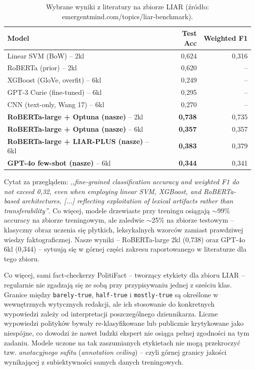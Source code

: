 \documentclass[11pt,a4paper]{article}
\begin{document}
\begin{table}[h]
\centering
\caption{Wybrane wyniki z literatury na zbiorze LIAR (źródło:
emergentmind.com/topics/liar-benchmark).}
\label{tab:liar_ceiling}
\begin{tabular}{lrr}
\toprule
Model & Test Acc & Weighted F1 \\
\midrule
Linear SVM (BoW) -- 2kl                  & 0{,}624 & 0{,}316 \\
RoBERTa (prior) -- 2kl                   & 0{,}620 & -- \\
XGBoost (GloVe, overfit) -- 6kl          & 0{,}249 & -- \\
GPT-3 Curie (fine-tuned) -- 6kl          & 0{,}295 & -- \\
CNN (text-only, Wang 17) -- 6kl          & 0{,}270 & -- \\
\midrule
\textbf{RoBERTa-large + Optuna (nasze)} -- 2kl & \textbf{0{,}738} & 0{,}735 \\
\textbf{RoBERTa-large + Optuna (nasze)} -- 6kl & \textbf{0{,}357} & 0{,}357 \\
\textbf{RoBERTa-large + LIAR-PLUS (nasze)} -- 6kl & \textbf{0{,}383} & 0{,}379 \\
\textbf{GPT-4o few-shot (nasze)} -- 6kl  & \textbf{0{,}344} & 0{,}341 \\
\bottomrule
\end{tabular}
\end{table}

Cytat za przeglądem: \emph{,,fine-grained classification accuracy and
weighted F1 do not exceed 0{,}32, even when employing linear SVM, XGBoost,
and RoBERTa-based architectures, [...] reflecting exploitation of lexical
artifacts rather than transferability''}. Co więcej, modele drzewiaste
przy treningu osiągają $\sim$99\% accuracy na zbiorze treningowym, ale
zaledwie $\sim$25\% na zbiorze testowym -- klasyczny obraz uczenia się
płytkich, leksykalnych wzorców zamiast prawdziwej wiedzy faktograficznej.
Nasze wyniki -- RoBERTa-large 2kl (0{,}738) oraz GPT-4o 6kl (0{,}344) --
sytuują się w górnej części zakresu raportowanego w literaturze dla tego
zbioru.

Co więcej, sami fact-checkerzy PolitiFact -- tworzący etykiety dla zbioru
LIAR -- regularnie nie zgadzają się ze sobą przy przypisywaniu jednej z
sześciu klas. Granice między \texttt{barely-true}, \texttt{half-true} i
\texttt{mostly-true} są określone w wewnętrznych wytycznych redakcji, ale
ich stosowanie do konkretnych wypowiedzi zależy od interpretacji
poszczególnego dziennikarza. Liczne wypowiedzi polityków bywały
re-klasyfikowane lub publicznie krytykowane jako niespójne, co dowodzi że
nawet ludzki ekspert nie osiąga pełnej zgodności na tym zadaniu. Modele
uczone na tak zaszumianych etykietach nie mogą przekroczyć tzw.
\emph{anotacyjnego sufitu} (\emph{annotation ceiling}) -- czyli górnej
granicy jakości wynikającej z subiektywności samych danych
treningowych.
\end{document}
